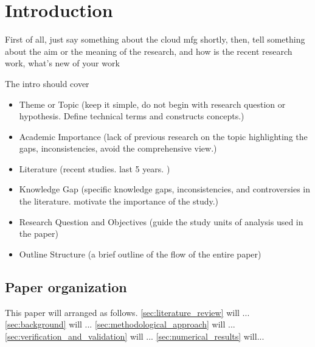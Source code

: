 \section{Introduction}
First of all, just say something about the cloud mfg shortly,
then, tell something about the aim or the meaning of the research,
and how is the recent research work, what's new of your work 


The intro should cover 
\begin{itemize}
	\item Theme or Topic (keep it simple, do not begin with research question or hypothesis. Define technical terms and constructs concepts.)
	\item Academic Importance (lack of previous research on the topic highlighting the gaps, inconsistencies, avoid the comprehensive view.)
	\item Literature (recent studies. last 5 years. )
	\item Knowledge Gap (specific knowledge gaps, inconsistencies, and controversies in the literature. motivate the importance of the study.)
	\item Research Question and Objectives (guide the study units of analysis used in the paper)
	\item Outline Structure (a brief outline of the flow of the entire paper)
\end{itemize}


\subsection{Paper organization} %
\label{sub:paper_organization}
This paper will arranged as follows. \autoref{sec:literature_review} will ... \autoref{sec:background} will ... \autoref{sec:methodological_approach} will ... \autoref{sec:verification_and_validation} will ... \autoref{sec:numerical_results} will...
